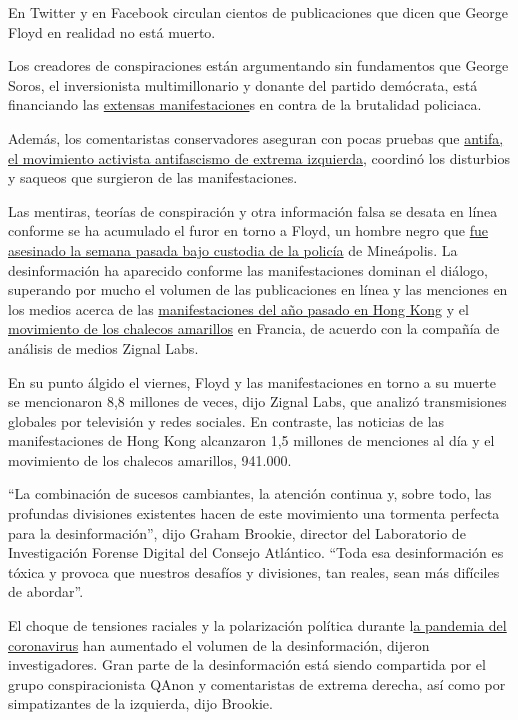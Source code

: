 En Twitter y en Facebook circulan cientos de publicaciones que dicen que
George Floyd en realidad no está muerto.

Los creadores de conspiraciones están argumentando sin fundamentos que
George Soros, el inversionista multimillonario y donante del partido
demócrata, está financiando las
\href{https://www.nytimes.com/live/2020/george-floyd-protests-today-06-01}{extensas
manifestacione}s en contra de la brutalidad policiaca.

Además, los comentaristas conservadores aseguran con pocas pruebas que
\href{https://www.nytimes.com/es/2020/06/02/espanol/mundo/que-es-antifa.html}{antifa,
el movimiento activista antifascismo de extrema izquierda}, coordinó los
disturbios y saqueos que surgieron de las manifestaciones.

Las mentiras, teorías de conspiración y otra información falsa se desata
en línea conforme se ha acumulado el furor en torno a Floyd, un hombre
negro que
\href{https://www.nytimes.com/2020/05/31/us/george-floyd-investigation.html}{fue
asesinado la semana pasada bajo custodia de la policía} de Mineápolis.
La desinformación ha aparecido conforme las manifestaciones dominan el
diálogo, superando por mucho el volumen de las publicaciones en línea y
las menciones en los medios acerca de las
\href{https://www.nytimes.com/news-event/hong-kong-protests}{manifestaciones
del año pasado en Hong Kong} y el
\href{https://www.nytimes.com/2019/04/15/business/yellow-vests-movement-inequality.html}{movimiento
de los chalecos amarillos} en Francia, de acuerdo con la compañía de
análisis de medios Zignal Labs.

En su punto álgido el viernes, Floyd y las manifestaciones en torno a su
muerte se mencionaron 8,8 millones de veces, dijo Zignal Labs, que
analizó transmisiones globales por televisión y redes sociales. En
contraste, las noticias de las manifestaciones de Hong Kong alcanzaron
1,5 millones de menciones al día y el movimiento de los chalecos
amarillos, 941.000.

``La combinación de sucesos cambiantes, la atención continua y, sobre
todo, las profundas divisiones existentes hacen de este movimiento una
tormenta perfecta para la desinformación'', dijo Graham Brookie,
director del Laboratorio de Investigación Forense Digital del Consejo
Atlántico. ``Toda esa desinformación es tóxica y provoca que nuestros
desafíos y divisiones, tan reales, sean más difíciles de abordar''.

El choque de tensiones raciales y la polarización política durante
l\href{https://www.nytimes.com/news-event/coronavirus?action=click\&pgtype=Article\&state=default\&module=styln-coronavirus\&variant=show\&region=TOP_BANNER\&context=storylines_menu}{a
pandemia del coronavirus} han aumentado el volumen de la desinformación,
dijeron investigadores. Gran parte de la desinformación está siendo
compartida por el grupo conspiracionista QAnon y comentaristas de
extrema derecha, así como por simpatizantes de la izquierda, dijo
Brookie.

